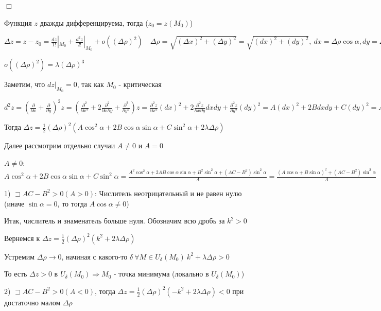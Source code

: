 \documentclass[12pt]{article}
\begin{document}
    $\Box$

    Функция $z$ дважды дифференцируема, тогда ($z_0 = z(M_0)$)

    $\Delta z = z - z_0 = \frac{dz}{1!} |_{M_0} + \frac{d^2 z}{2!} |_{M_0} + o((\Delta \rho)^2) \quad \Delta \rho = \sqrt{(\Delta x)^2 + (\Delta y)^2} = \sqrt{(dx)^2 + (dy)^2}, \ dx = \Delta\rho \cos\alpha, dy = \Delta\rho \sin\alpha$

    $o((\Delta \rho)^2) = \lambda (\Delta \rho)^3$

    Заметим, что $dz |_{M_0} = 0$, так как $M_0$ - критическая

    $d^2 z = \left(\frac{\partial}{\partial x} + \frac{\partial}{\partial y}\right)^2 z = \left(\frac{\partial^2}{\partial x^2} + 2 \frac{\partial^2}{\partial x \partial y} + \frac{\partial^2}{\partial y^2}\right) z =
    \frac{\partial^2 z}{\partial x^2} (dx)^2 + 2 \frac{\partial^2 z}{\partial x \partial y} dxdy + \frac{\partial^2 z}{\partial y^2} (dy)^2 = A (dx)^2 + 2B dxdy + C(dy)^2 =
    A(\Delta \rho)^2 \cos^2\alpha + 2B (\Delta \rho)^2 \cos\alpha\sin\alpha + C(\Delta \rho)^2 \sin^2\alpha$

    Тогда $\Delta z = \frac{1}{2} (\Delta \rho)^2 (A\cos^2\alpha + 2B\cos\alpha\sin\alpha + C\sin^2\alpha + 2\lambda \Delta \rho)$

    Далее рассмотрим отдельно случаи $A \neq 0$ и $A = 0$

    $A \neq 0$: $A\cos^2\alpha + 2B\cos\alpha\sin\alpha + C\sin^2\alpha = \frac{A^2\cos^2\alpha + 2AB\cos\alpha\sin\alpha + B^2\sin^2\alpha + (AC - B^2)\sin^2\alpha}{A} =
    \frac{(A\cos\alpha + B\sin\alpha)^2 + (AC - B^2)\sin^2\alpha}{A}$

    1) $\sqsupset AC - B^2 > 0 (A > 0)$: Числитель неотрицательный и не равен нулю (иначе $\sin\alpha = 0$, то тогда $A\cos\alpha \neq 0$)

    Итак, числитель и знаменатель больше нуля. Обозначим всю дробь за $k^2 > 0$

    Вернемся к $\Delta z = \frac{1}{2}(\Delta \rho)^2 (k^2 + 2\lambda\Delta\rho)$

    Устремим $\Delta \rho \rightarrow 0$, начиная с какого-то $\delta \ \forall M \in U_\delta(M_0) \ k^2 + \lambda\Delta\rho > 0$

    То есть $\Delta z > 0$ в $U_\delta(M_0) \Longrightarrow M_0$ - точка минимума (локально в $U_\delta(M_0)$)

    2) $\sqsupset AC - B^2 > 0 (A < 0)$, тогда $\Delta z = \frac{1}{2}(\Delta \rho)^2 (-k^2 + 2\lambda\Delta\rho) < 0$ при достаточно малом $\Delta \rho$
\end{document}
